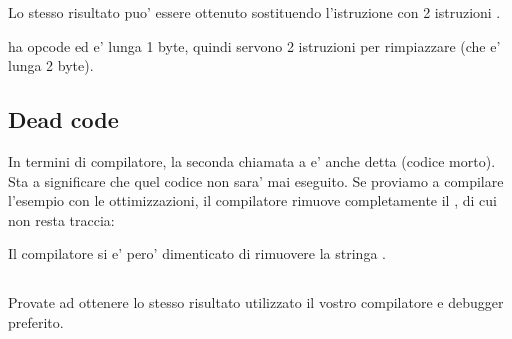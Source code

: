 

Lo stesso risultato puo' essere ottenuto sostituendo l'istruzione \JMP con 2 istruzioni \NOP.

\NOP ha opcode  ed e' lunga 1 byte, quindi servono 2 istruzioni per rimpiazzare \JMP (che e' lunga 2 byte).

\subsection{Dead code}

In termini di compilatore, la seconda chiamata a \printf e' anche detta  (codice morto).
Sta a significare che quel codice non sara' mai eseguito. Se proviamo a compilare l'esempio con le ottimizzazioni, il compilatore
rimuove completamente il , di cui non resta traccia:



Il compilatore si e' pero' dimenticato di rimuovere la stringa .


\subsection{\Exercise}


Provate ad ottenere lo stesso risultato utilizzato il vostro compilatore e debugger preferito.
